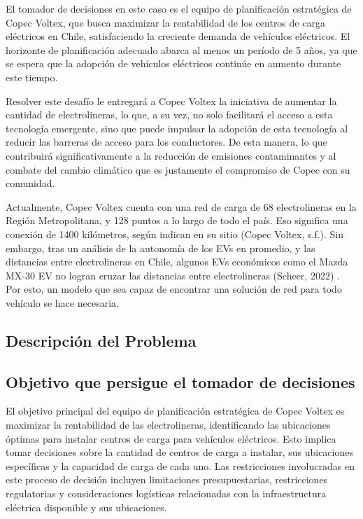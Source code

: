\documentclass[letterpaper]{article}
\begin{document}
\begin{flushleft}
		El tomador de decisiones en este caso es el equipo de planificación estratégica de Copec Voltex, que busca maximizar la rentabilidad de los centros de carga eléctricos en Chile, satisfaciendo la creciente demanda de vehículos eléctricos. El horizonte de planificación adecuado abarca al menos un período de 5 años, ya que se espera que la adopción de vehículos eléctricos continúe en aumento durante este tiempo. 

		Resolver este desafío le entregará a Copec Voltex la iniciativa de aumentar la cantidad de electrolineras, lo que, a su vez, no solo facilitará el acceso a esta tecnología emergente, sino que puede impulsar la adopción de esta tecnología al reducir las barreras de acceso para los conductores. De esta manera, lo que contribuirá significativamente a la reducción de emisiones contaminantes y al combate del cambio climático que es justamente el compromiso de Copec con su comunidad. 

		Actualmente, Copec Voltex cuenta con una red de carga de 68 electrolineras en la Región Metropolitana, y 128 puntos a lo largo de todo el país. Eso significa una conexión de 1400 kilómetros, según indican en su sitio (Copec Voltex, s.f.). Sin embargo, tras un análisis de la autonomía de los EVs en promedio, y las distancias entre electrolineras en Chile, algunos EVs económicos como el Mazda MX-30 EV no logran cruzar las distancias entre electrolineras (Scheer, 2022) \cite{scheer}. Por esto, un modelo que sea capaz de encontrar una solución de red para todo vehículo se hace necesaria. 
 
		\subsection{Descripción del Problema}
		\subsection{Objetivo que persigue el tomador de decisiones}
		El objetivo principal del equipo de planificación estratégica de Copec Voltex es maximizar la rentabilidad de las electrolineras, identificando las ubicaciones óptimas para instalar centros de carga para vehículos eléctricos. Esto implica tomar decisiones sobre la cantidad de centros de carga a instalar, sus ubicaciones específicas y la capacidad de carga de cada uno. Las restricciones involucradas en este proceso de decisión incluyen limitaciones presupuestarias, restricciones regulatorias y consideraciones logísticas relacionadas con la infraestructura eléctrica disponible y sus ubicaciones. 		

\end{flushleft}
\end{document}
